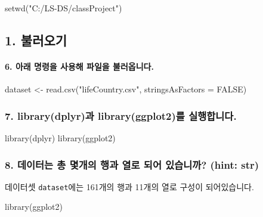 \documentclass[a4paper]{article}
\newenvironment{Shaded}{}{}
\newcommand{\KeywordTok}[1]{\textcolor[rgb]{0.00,0.00,1.00}{#1}}
\newcommand{\DataTypeTok}[1]{#1}
\newcommand{\StringTok}[1]{\textcolor[rgb]{0.00,0.50,0.50}{#1}}
\newcommand{\OtherTok}[1]{\textcolor[rgb]{1.00,0.25,0.00}{#1}}
\newcommand{\NormalTok}[1]{#1}
\let\oldparagraph\paragraph
\renewcommand{\paragraph}[1]{\oldparagraph{#1}\mbox{}}
\begin{document}
\begin{Shaded}
\begin{Highlighting}[]
\KeywordTok{setwd}\NormalTok{(}\StringTok{"C:/LS-DS/classProject"}\NormalTok{)}
\end{Highlighting}
\end{Shaded}

\subsection{1. 불러오기}

\paragraph{6. 아래 명령을 사용해 파일을 불러옵니다.}\label{----.}

\begin{Shaded}
\begin{Highlighting}[]
\NormalTok{dataset <-}\StringTok{ }\KeywordTok{read.csv}\NormalTok{(}\StringTok{"lifeCountry.csv"}\NormalTok{, }\DataTypeTok{stringsAsFactors =} \OtherTok{FALSE}\NormalTok{)}
\end{Highlighting}
\end{Shaded}

\subsubsection{7. library(dplyr)과 library(ggplot2)를
실행합니다.}\label{librarydplyr-libraryggplot2-.}

\begin{Shaded}
\begin{Highlighting}[]
\KeywordTok{library}\NormalTok{(dplyr)}
\KeywordTok{library}\NormalTok{(ggplot2)}
\end{Highlighting}
\end{Shaded}

\subsubsection{8. 데이터는 총 몇개의 행과 열로 되어 있습니까? (hint:
str)}\label{-------hint-str}

데이터셋 \texttt{dataset}에는 161개의 행과 11개의 열로 구성이
되어있습니다.

\begin{Shaded}
\begin{Highlighting}[]
\KeywordTok{library}\NormalTok{(ggplot2)}
\end{Highlighting}
\end{Shaded}
\end{document}
